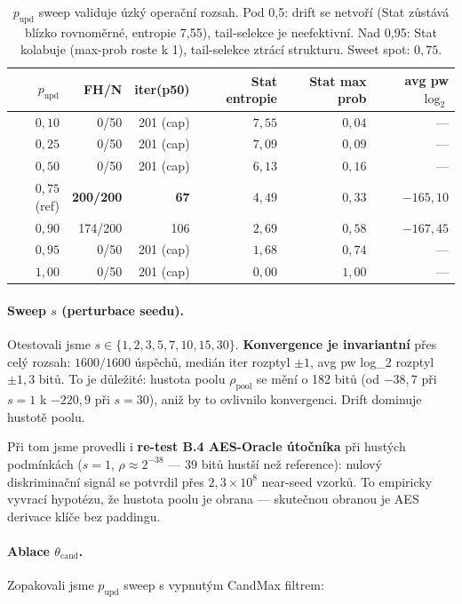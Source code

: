 \documentclass[11pt,a4paper]{article}
\begin{document}
\begin{table}[ht]
\centering
\small
\begin{tabular}{rrrrrr}
\toprule
$p_\text{upd}$ & FH/N & iter(p50) & Stat entropie & Stat max prob & avg pw $\log_2$ \\
\midrule
$0{,}10$ & 0/50 & 201 (cap) & $7{,}55$ & $0{,}04$ & --- \\
$0{,}25$ & 0/50 & 201 (cap) & $7{,}09$ & $0{,}09$ & --- \\
$0{,}50$ & 0/50 & 201 (cap) & $6{,}13$ & $0{,}16$ & --- \\
\textbf{$0{,}75$} (ref) & \textbf{200/200} & \textbf{67} & $4{,}49$ & $0{,}33$ & $-165{,}10$ \\
$0{,}90$ & 174/200 & 106 & $2{,}69$ & $0{,}58$ & $-167{,}45$ \\
$0{,}95$ & 0/50 & 201 (cap) & $1{,}68$ & $0{,}74$ & --- \\
$1{,}00$ & 0/50 & 201 (cap) & $0{,}00$ & $1{,}00$ & --- \\
\bottomrule
\end{tabular}
\caption{$p_\text{upd}$ sweep validuje úzký operační rozsah. Pod 0{,}5: drift se netvoří (Stat zůstává blízko rovnoměrné, entropie 7{,}55), tail-selekce je neefektivní. Nad 0{,}95: Stat kolabuje (max-prob roste k 1), tail-selekce ztrácí strukturu. Sweet spot: $0{,}75$.}
\label{tab:pop-pupd-sweep}
\end{table}

\paragraph{Sweep $s$ (perturbace seedu).}
Otestovali jsme $s \in \{1, 2, 3, 5, 7, 10, 15, 30\}$. \textbf{Konvergence je invariantní} přes celý rozsah: $1600/1600$ úspěchů, medián iter rozptyl $\pm 1$, avg pw log\_2 rozptyl $\pm 1{,}3$ bitů. To je důležité: hustota poolu $\rho_\text{pool}$ se mění o 182 bitů (od $-38{,}7$ při $s=1$ k $-220{,}9$ při $s=30$), aniž by to ovlivnilo konvergenci. Drift dominuje hustotě poolu.

Při tom jsme provedli i \textbf{re-test B.4 AES-Oracle útočníka} při hustých podmínkách ($s=1$, $\rho \approx 2^{-38}$ --- 39 bitů hustší než reference): nulový diskriminační signál se potvrdil přes $2{,}3 \times 10^8$ near-seed vzorků. To empiricky vyvrací hypotézu, že hustota poolu je obrana --- skutečnou obranou je AES derivace klíče bez paddingu.

\paragraph{Ablace $\theta_\text{cand}$.}
Zopakovali jsme $p_\text{upd}$ sweep s vypnutým CandMax filtrem:
\end{document}
